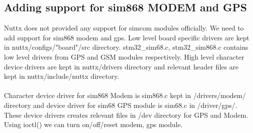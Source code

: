 \subsection*{Adding support for sim868 MODEM and GPS}
Nuttx does not provided any support for simcom modules officially. We need to add support for sim868 modem and gps. Low level board specific drivers are kept in nuttx/configs/"board"/src directory. stm32{\_}sim68.c, stm32{\_}sim868.c contains low level drivers from GPS and GSM modules respectively. High level character device drivers are kept in nuttx/drivers directory and relevant header files are kept in nuttx/include/nuttx directory.
\paragraph*{}
Character device driver for sim868 Modem is sim868.c kept in /drivers/modem/ directory and device driver for sim68 GPS module is sim68.c in  /driver/gps/. These device drivers creates relevant files in /dev directory for GPS and Modem. Using ioctl() we can turn on/off/reset modem, gps module.